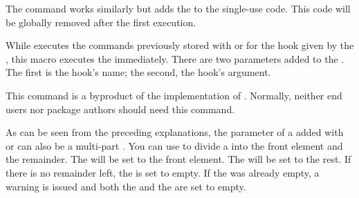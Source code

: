The  command works similarly but adds the
 to the single-use code. This code will be globally removed
after the first execution.%
\EndIndexGroup

\begin{Declaration}
\end{Declaration}
While
 executes the commands previously stored
with  or
 for the hook given by the
, this macro executes the  immediately. There
are two parameters added to the . The first is the hook's name;
the second, the hook's argument.

This command is a byproduct of the implementation of
. Normally, neither end users nor package
authors should need this command.%
\EndIndexGroup

\begin{Declaration}
\end{Declaration}
As can be seen from the preceding
explanations, the parameter of a  added with
 or
 can also be a multi-part
. You can use  to divide a
 into the front element and the remainder. The
 will be set to the front element. The  will be set to the rest. If there is no remainder left, the
 is set to empty. If the  was already
empty, a warning is issued and both the  and the
 are set to empty.

